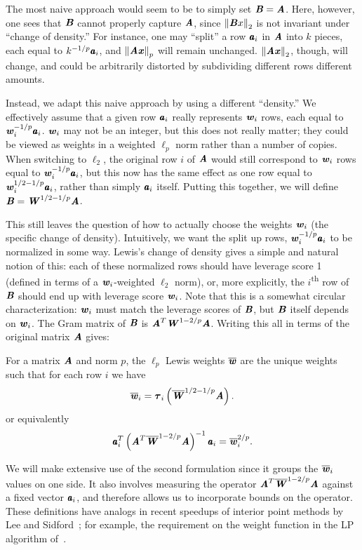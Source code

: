 The most naive approach would seem to be to simply set $\BB = \AA$.  Here, however, one
sees that $\BB$ cannot properly capture $\AA$, since $\norm{\BB x}_2$ is not invariant under
``change of density.''  For instance, one may ``split'' a row $\aa_i$ in $\AA$ into $k$ pieces,
each equal to $k^{-1/p} \aa_i$, and $\norm{\AA \xx}_p$ will remain unchanged.
$\norm{\AA \xx}_2$, though, will change, and could be arbitrarily distorted by subdividing different
rows different amounts.

Instead, we adapt this naive approach by using a different ``density.''  We effectively assume
that a given row $\aa_i$ really represents $\ww_i$ rows, each equal to $\ww_i^{-1/p} \aa_i$.
$\ww_i$ may not be an integer, but this does not really matter; they could be viewed as
weights in a weighted $\ell_p$ norm rather than a number of copies.  When switching to $\ell_2$,
the original row $i$ of $\AA$ would still correspond to $\ww_i$ rows equal to $\ww_i^{-1/p} \aa_i$, but
this now has the same effect as one row equal to $\ww_i^{1/2 - 1/p} \aa_i$, rather than simply $\aa_i$
itself.  Putting this together, we will define $\BB = \WW^{1/2 - 1/p} \AA$.

This still leaves the question of how to actually choose the weights $\ww_i$ (the
specific change of density).  Intuitively, we want the split up rows, $\ww_i^{-1/p} \aa_i$
to be normalized in some way.  Lewis's change of density gives a simple and natural
notion of this: each of these normalized rows should have leverage score 1
(defined in terms of a $\ww_i$-weighted $\ell_2$ norm), or, more explicitly,
the $i$\textsuperscript{th} row of $\BB$ should end up with leverage score $\ww_i$.  Note that
this is a somewhat circular characterization: $\ww_i$ must match the leverage
scores of $\BB$, but $\BB$ itself depends on $\ww_i$.  The Gram matrix
of $\BB$ is $\AA^T \WW^{1 - 2/p} \AA$.  Writing this all in terms of the
original matrix $\AA$ gives:
\begin{definition}
\label{def:lewis}
For a matrix $\AA$ and norm $p$, the $\ell_p$ Lewis weights $\wwbar$ are the unique
weights such that for each row $i$ we have
\begin{equation*}
 \wwbar_i = \ttau_{i} \left( \WWbar^{1/2 - 1/p} \AA \right).
\end{equation*}
 or equivalently
\begin{equation*}
\aa_i^T \left( \AA^T \WWbar^{1 - 2/p} \AA \right)^{-1} \aa_i = \wwbar^{2/p}_i.
\end{equation*}
\end{definition}
We will make extensive use of the second formulation
since it groups the $\wwbar_i$ values on one side.
It also involves measuring the operator $\AA^T \WWbar^{1 - 2/p} \AA$ against a fixed
vector $\aa_i$, and therefore allows us to incorporate bounds on the operator.
These definitions have analogs in recent speedups of interior point methods
by Lee and Sidford~\cite{LeeS14}; for example, the requirement on the weight function
in the LP algorithm of~\cite{LeeS13a:arxiv}.

